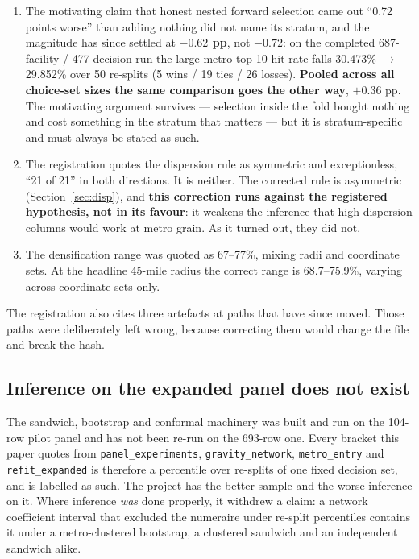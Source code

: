 \documentclass[conference]{IEEEtran}
\begin{document}
\begin{enumerate}
\item The motivating claim that honest nested forward selection came out
``0.72 points worse'' than adding nothing did not name its stratum, and the
magnitude has since settled at \textbf{$-0.62$ pp}, not $-0.72$: on the
completed 687-facility / 477-decision run the large-metro top-10 hit rate
falls 30.473\% $\rightarrow$ 29.852\% over 50 re-splits (5 wins / 19 ties /
26 losses). \textbf{Pooled across all choice-set sizes the same comparison goes
the other way}, $+0.36$ pp. The motivating argument survives --- selection
inside the fold bought nothing and cost something in the stratum that matters
--- but it is stratum-specific and must always be stated as such.

\item The registration quotes the dispersion rule as symmetric and
exceptionless, ``21 of 21'' in both directions. It is neither. The corrected
rule is asymmetric (Section~\ref{sec:disp}), and \textbf{this correction runs
against the registered hypothesis, not in its favour}: it weakens the
inference that high-dispersion columns would work at metro grain. As it turned
out, they did not.

\item The densification range was quoted as 67--77\%, mixing radii and
coordinate sets. At the headline 45-mile radius the correct range is
68.7--75.9\%, varying across coordinate sets only.
\end{enumerate}

The registration also cites three artefacts at paths that have since moved.
Those paths were deliberately left wrong, because correcting them would change
the file and break the hash.

\subsection{Inference on the expanded panel does not exist}

The sandwich, bootstrap and conformal machinery was built and run on the
104-row pilot panel and has not been re-run on the 693-row one. Every bracket
this paper quotes from \texttt{panel\_experiments}, \texttt{gravity\_network},
\texttt{metro\_entry} and \texttt{refit\_expanded} is therefore a percentile
over re-splits of one fixed decision set, and is labelled as such. The project
has the better sample and the worse inference on it. Where inference \emph{was}
done properly, it withdrew a claim: a network coefficient interval that
excluded the numeraire under re-split percentiles contains it under a
metro-clustered bootstrap, a clustered sandwich and an independent sandwich
alike.
\end{document}
